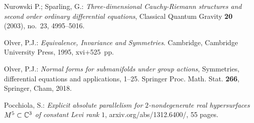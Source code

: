 \begin{thebibliography}{XL}
{\smallskip

Nurowski P.; Sparling, G.:
{\em Three-dimensional Cauchy-Riemann structures and
second order ordinary differential equations},
Classical Quantum Gravity {\bf 20} (2003), no.~23, 4995--5016.

\smallskip

Olver, P.J.:
{\em Equivalence, Invariance and Symmetries}. Cambridge, Cambridge
University Press, 1995, xvi+525~pp.

\smallskip

Olver, P.J.:
{\em Normal forms for submanifolds under group actions},
Symmetries, differential equations and applications, 1--25.
Springer Proc. Math. Stat. {\bf 266}, Springer, Cham, 2018.

\smallskip

Pocchiola, S.:
{\em Explicit absolute parallelism for 
$2$-nondegenerate real hypersurfaces
$M^5 \subset \mathbb{C}^3$ of constant Levi rank $1$}, 
{\tiny\sf arxiv.org/abs/1312.6400/}, 55 pages.

\smallskip






}

\end{thebibliography}
